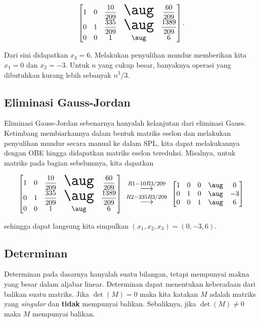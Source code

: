\[
    \begin{bmatrix}
        1 & 0 & \dfrac{10}{209}  & \text{\huge $\aug$} & \dfrac{60}{209}     \\
        0 & 1 & \dfrac{335}{209} & \text{\huge $\aug$} & \dfrac{1389}{209}   \\
        0 & 0 & 1 & \aug & 6
    \end{bmatrix}.
\]

Dari sini didapatkan $x_3 = 6$. Melakukan penyulihan mundur memberikan kita $x_1 = 0$ dan $x_2 = -3$. Untuk $n$ yang cukup besar, banyaknya operasi yang dibutuhkan kurang lebih sebanyak $n^3/3$.

\subsection{Eliminasi Gauss-Jordan}

Eliminasi Gauss-Jordan sebenarnya hanyalah kelanjutan dari eliminasi Gauss. Ketimbang membiarkannya dalam bentuk matriks eselon dan melakukan penyulihan mundur secara manual ke dalam SPL, kita dapat melakukannya dengan OBE hingga didapatkan matriks eselon tereduksi. Misalnya, untuk matriks pada bagian sebelumnya, kita dapatkan

\[
    \begin{bmatrix}
        1 & 0 & \dfrac{10}{209}  & \text{\huge $\aug$} & \dfrac{60}{209}     \\
        0 & 1 & \dfrac{335}{209} & \text{\huge $\aug$} & \dfrac{1389}{209}   \\
        0 & 0 & 1 & \aug & 6
    \end{bmatrix}
    \text{\large $\begin{array}{c}
        \stackrel{R1 - 10R3/209}{\longrightarrow} \\
        \stackrel{R2 - 335R3/209}{\longrightarrow} 
    \end{array}$}
    \begin{bmatrix}
        1 & 0 & 0 & \aug & 0  \\
        0 & 1 & 0 & \aug & -3 \\
        0 & 0 & 1 & \aug & 6
    \end{bmatrix}
\]

sehingga dapat langsung kita simpulkan $(x_1, x_2, x_3) = (0, -3, 6)$.

\subsection{Determinan}
    Determinan pada dasarnya hanyalah suatu bilangan, tetapi mempunyai makna yang besar dalam aljabar linear. Determinan dapat menentukan keberadaan dari balikan suatu matriks. Jika $\det(M) = 0$ maka kita katakan $M$ adalah matriks yang \textit{singular} dan \textbf{tidak} mempunyai balikan. Sebaliknya, jika $\det(M) \neq 0$ maka $M$ mempunyai balikan.


